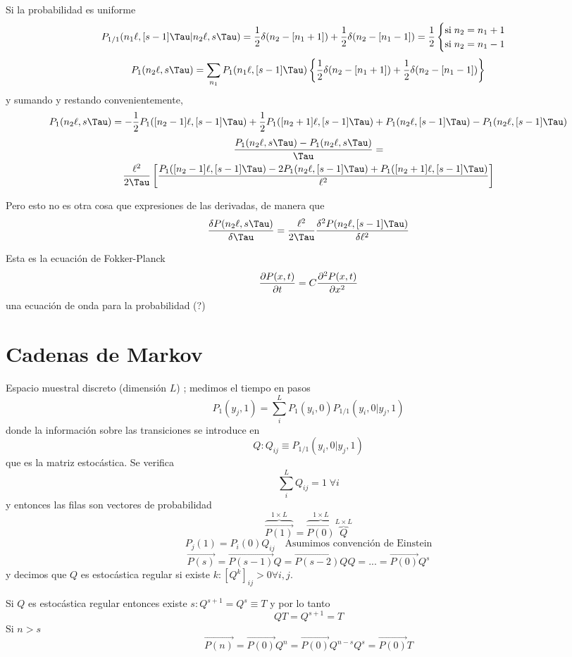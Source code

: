 \documentclass[10pt,oneside]{CBFT_book}
\begin{document}
Si la probabilidad es uniforme 
\[
	P_{1/1}(n_1\ell,[s-1]\Tau|n_2\ell,s\Tau) =
	\frac{1}{2}\delta(n_2-[n_1+1]) + \frac{1}{2}\delta(n_2-[n_1-1]) = \frac{1}{2}
	\begin{cases}
	 \text{si} \; n_2 = n_1 + 1 \\
	 \text{si} \; n_2 = n_1 - 1
	\end{cases}
\]
\[
	P_1(n_2\ell,s\Tau) = \sum_{n_1} P_1(n_1\ell,[s-1]\Tau)\left\{
	\frac{1}{2}\delta(n_2-[n_1+1]) + \frac{1}{2}\delta(n_2-[n_1-1])
	\right\}
\]
y sumando y restando convenientemente,
\[
	P_1(n_2\ell,s\Tau) = -\frac{1}{2}P_1([n_2-1]\ell,[s-1]\Tau) + 
\frac{1}{2}P_1([n_2+1]\ell,[s-1]\Tau)
	+ P_1(n_2\ell,[s-1]\Tau) - P_1(n_2\ell,[s-1]\Tau)
\]
\begin{multline}
	\frac{P_1(n_2\ell,s\Tau) - P_1(n_2\ell,s\Tau)}{\Tau} = \\
	\frac{\ell^2}{2\Tau} \left[ \frac{ P_1([n_2-1]\ell,[s-1]\Tau) - 
2P_1(n_2\ell,[s-1]\Tau) + P_1([n_2+1]\ell,[s-1]\Tau) }{\ell^2} \right] 
\end{multline}


Pero esto no es otra cosa que expresiones de las derivadas, de manera que
\[
	\frac{\delta P(n_2\ell,s\Tau)}{\delta \Tau} =
	\frac{\ell^2}{2\Tau} \frac{\delta^2 P(n_2\ell,[s-1]\Tau)}{\delta\ell^2}
\]

Esta es la ecuación de Fokker-Planck
\[
	\dpar{P(x,t)}{t} = C \dpar[2]{P(x,t)}{x}
\]
una ecuación de onda para la probabilidad (?)


\section{Cadenas de Markov}

Espacio muestral discreto (dimensión $L$) ; medimos el tiempo en pasos
\[
	P_1(y_j,1) = \sum_i^L P_1(y_i,0) P_{1/1}(y_i,0|y_j,1)
\]
donde la información sobre las transiciones se introduce en
\[
	Q : Q_{ij} \equiv P_{1/1}(y_i,0|y_j,1)
\]
que es la matriz estocástica.
Se verifica
\[
	\sum_i^L Q_{ij} = 1 \; \forall i
\]
y entonces las filas son vectores de probabilidad
\[
	\overbrace{\vec{P(1)}}^{1\times L} =  \overbrace{\vec{P(0)}}^{1\times L} 
\overbrace{Q}^{L\times L}
\]
\[
	P_j(1) = P_i(0) Q_{ij} \quad \text{Asumimos convención de Einstein}
\]
\[
	\vec{P(s)} = \vec{P(s-1)}Q = \vec{P(s-2)} Q Q = ... = \vec{P(0)}Q^s
\] 
y decimos que $Q$ es estocástica regular si existe $k : [Q^k]_{ij} > 0 \forall i,j$.

Si $Q$ es estocástica regular entonces existe $s : Q^{s+1} = Q^s \equiv T$ y por lo tanto
\[
	Q T = Q^{s+1} = T
\]
Si $n>s$
\[
	\vec{P(n)} = \vec{P(0)} Q^n = \vec{P(0)} Q^{n-s} Q^s = \vec{P(0)} T
\]
\end{document}

